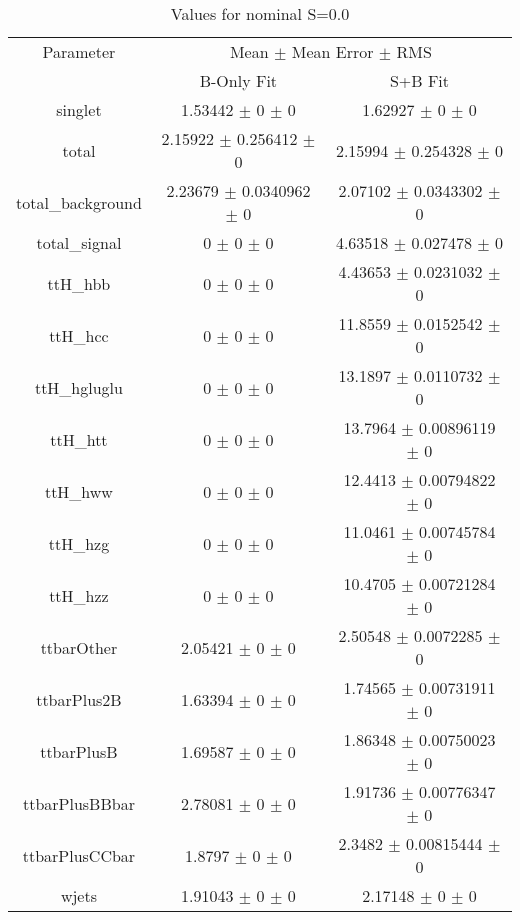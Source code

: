 \begin{table}
\centering
\caption{Values for nominal S=0.0}
\begin{tabular}{ccc}
\toprule
Parameter & \multicolumn{2}{c}{Mean $\pm$ Mean Error $\pm$ RMS}\\
 & B-Only Fit & S+B Fit\\
\midrule
singlet & \num{1.53442} $\pm$ \num{0} $\pm$ \num{0} & \num{1.62927} $\pm$ \num{0} $\pm$ \num{0}\\
total & \num{2.15922} $\pm$ \num{0.256412} $\pm$ \num{0} & \num{2.15994} $\pm$ \num{0.254328} $\pm$ \num{0}\\
total\_background & \num{2.23679} $\pm$ \num{0.0340962} $\pm$ \num{0} & \num{2.07102} $\pm$ \num{0.0343302} $\pm$ \num{0}\\
total\_signal & \num{0} $\pm$ \num{0} $\pm$ \num{0} & \num{4.63518} $\pm$ \num{0.027478} $\pm$ \num{0}\\
ttH\_hbb & \num{0} $\pm$ \num{0} $\pm$ \num{0} & \num{4.43653} $\pm$ \num{0.0231032} $\pm$ \num{0}\\
ttH\_hcc & \num{0} $\pm$ \num{0} $\pm$ \num{0} & \num{11.8559} $\pm$ \num{0.0152542} $\pm$ \num{0}\\
ttH\_hgluglu & \num{0} $\pm$ \num{0} $\pm$ \num{0} & \num{13.1897} $\pm$ \num{0.0110732} $\pm$ \num{0}\\
ttH\_htt & \num{0} $\pm$ \num{0} $\pm$ \num{0} & \num{13.7964} $\pm$ \num{0.00896119} $\pm$ \num{0}\\
ttH\_hww & \num{0} $\pm$ \num{0} $\pm$ \num{0} & \num{12.4413} $\pm$ \num{0.00794822} $\pm$ \num{0}\\
ttH\_hzg & \num{0} $\pm$ \num{0} $\pm$ \num{0} & \num{11.0461} $\pm$ \num{0.00745784} $\pm$ \num{0}\\
ttH\_hzz & \num{0} $\pm$ \num{0} $\pm$ \num{0} & \num{10.4705} $\pm$ \num{0.00721284} $\pm$ \num{0}\\
ttbarOther & \num{2.05421} $\pm$ \num{0} $\pm$ \num{0} & \num{2.50548} $\pm$ \num{0.0072285} $\pm$ \num{0}\\
ttbarPlus2B & \num{1.63394} $\pm$ \num{0} $\pm$ \num{0} & \num{1.74565} $\pm$ \num{0.00731911} $\pm$ \num{0}\\
ttbarPlusB & \num{1.69587} $\pm$ \num{0} $\pm$ \num{0} & \num{1.86348} $\pm$ \num{0.00750023} $\pm$ \num{0}\\
ttbarPlusBBbar & \num{2.78081} $\pm$ \num{0} $\pm$ \num{0} & \num{1.91736} $\pm$ \num{0.00776347} $\pm$ \num{0}\\
ttbarPlusCCbar & \num{1.8797} $\pm$ \num{0} $\pm$ \num{0} & \num{2.3482} $\pm$ \num{0.00815444} $\pm$ \num{0}\\
wjets & \num{1.91043} $\pm$ \num{0} $\pm$ \num{0} & \num{2.17148} $\pm$ \num{0} $\pm$ \num{0}\\
\bottomrule
\end{tabular}
\end{table}
